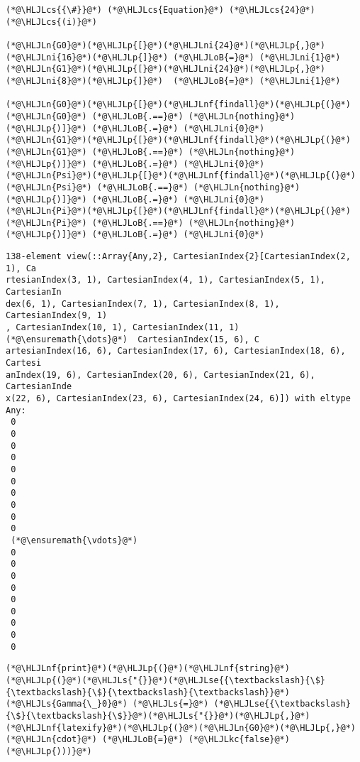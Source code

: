 \documentclass[12pt,a4paper]{article}
\newcommand{\HLJLkc}[1]{\textcolor[RGB]{59,151,46}{\textit{#1}}}
\newcommand{\HLJLn}[1]{#1}
\newcommand{\HLJLnf}[1]{\textcolor[RGB]{66,102,213}{#1}}
\newcommand{\HLJLs}[1]{\textcolor[RGB]{201,61,57}{#1}}
\newcommand{\HLJLse}[1]{\textcolor[RGB]{59,151,46}{#1}}
\newcommand{\HLJLni}[1]{\textcolor[RGB]{59,151,46}{#1}}
\newcommand{\HLJLoB}[1]{\textcolor[RGB]{102,102,102}{\textbf{#1}}}
\newcommand{\HLJLp}[1]{#1}
\newcommand{\HLJLcs}[1]{\textcolor[RGB]{153,153,119}{\textit{#1}}}
\begin{document}
\begin{lstlisting}
(*@\HLJLcs{{\#}}@*) (*@\HLJLcs{Equation}@*) (*@\HLJLcs{24}@*) (*@\HLJLcs{(i)}@*)

(*@\HLJLn{G0}@*)(*@\HLJLp{[}@*)(*@\HLJLni{24}@*)(*@\HLJLp{,}@*)(*@\HLJLni{16}@*)(*@\HLJLp{]}@*) (*@\HLJLoB{=}@*) (*@\HLJLni{1}@*)
(*@\HLJLn{G1}@*)(*@\HLJLp{[}@*)(*@\HLJLni{24}@*)(*@\HLJLp{,}@*)(*@\HLJLni{8}@*)(*@\HLJLp{]}@*)  (*@\HLJLoB{=}@*) (*@\HLJLni{1}@*)

(*@\HLJLn{G0}@*)(*@\HLJLp{[}@*)(*@\HLJLnf{findall}@*)(*@\HLJLp{(}@*)(*@\HLJLn{G0}@*) (*@\HLJLoB{.==}@*) (*@\HLJLn{nothing}@*)(*@\HLJLp{)]}@*) (*@\HLJLoB{.=}@*) (*@\HLJLni{0}@*)
(*@\HLJLn{G1}@*)(*@\HLJLp{[}@*)(*@\HLJLnf{findall}@*)(*@\HLJLp{(}@*)(*@\HLJLn{G1}@*) (*@\HLJLoB{.==}@*) (*@\HLJLn{nothing}@*)(*@\HLJLp{)]}@*) (*@\HLJLoB{.=}@*) (*@\HLJLni{0}@*)
(*@\HLJLn{Psi}@*)(*@\HLJLp{[}@*)(*@\HLJLnf{findall}@*)(*@\HLJLp{(}@*)(*@\HLJLn{Psi}@*) (*@\HLJLoB{.==}@*) (*@\HLJLn{nothing}@*)(*@\HLJLp{)]}@*) (*@\HLJLoB{.=}@*) (*@\HLJLni{0}@*)
(*@\HLJLn{Pi}@*)(*@\HLJLp{[}@*)(*@\HLJLnf{findall}@*)(*@\HLJLp{(}@*)(*@\HLJLn{Pi}@*) (*@\HLJLoB{.==}@*) (*@\HLJLn{nothing}@*)(*@\HLJLp{)]}@*) (*@\HLJLoB{.=}@*) (*@\HLJLni{0}@*)
\end{lstlisting}

\begin{lstlisting}
138-element view(::Array{Any,2}, CartesianIndex{2}[CartesianIndex(2, 1), Ca
rtesianIndex(3, 1), CartesianIndex(4, 1), CartesianIndex(5, 1), CartesianIn
dex(6, 1), CartesianIndex(7, 1), CartesianIndex(8, 1), CartesianIndex(9, 1)
, CartesianIndex(10, 1), CartesianIndex(11, 1)  (*@\ensuremath{\dots}@*)  CartesianIndex(15, 6), C
artesianIndex(16, 6), CartesianIndex(17, 6), CartesianIndex(18, 6), Cartesi
anIndex(19, 6), CartesianIndex(20, 6), CartesianIndex(21, 6), CartesianInde
x(22, 6), CartesianIndex(23, 6), CartesianIndex(24, 6)]) with eltype Any:
 0
 0
 0
 0
 0
 0
 0
 0
 0
 0
 (*@\ensuremath{\vdots}@*)
 0
 0
 0
 0
 0
 0
 0
 0
 0
\end{lstlisting}


\begin{lstlisting}
(*@\HLJLnf{print}@*)(*@\HLJLp{(}@*)(*@\HLJLnf{string}@*)(*@\HLJLp{(}@*)(*@\HLJLs{"{}}@*)(*@\HLJLse{{\textbackslash}{\$}{\textbackslash}{\$}{\textbackslash}{\textbackslash}}@*)(*@\HLJLs{Gamma{\_}0}@*) (*@\HLJLs{=}@*) (*@\HLJLse{{\textbackslash}{\$}{\textbackslash}{\$}}@*)(*@\HLJLs{"{}}@*)(*@\HLJLp{,}@*)(*@\HLJLnf{latexify}@*)(*@\HLJLp{(}@*)(*@\HLJLn{G0}@*)(*@\HLJLp{,}@*)(*@\HLJLn{cdot}@*) (*@\HLJLoB{=}@*) (*@\HLJLkc{false}@*)(*@\HLJLp{)))}@*)
\end{lstlisting}
\end{document}
